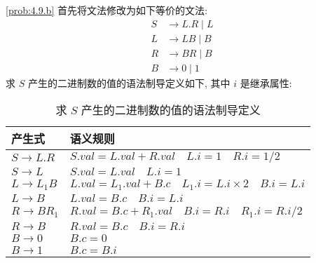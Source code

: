 \documentclass[boxes]{homework}
\begin{document}
\begin{solution}
    \ref{prob:4.9.b} 首先将文法修改为如下等价的文法:
    \begin{equation}
        \begin{aligned}
            S & \to L.R \mid L \\
            L & \to LB \mid B  \\
            R & \to BR \mid B  \\
            B & \to 0 \mid 1
        \end{aligned}
    \end{equation}
    求 $S$ 产生的二进制数的值的语法制导定义如下, 其中 $i$ 是继承属性:
    \begin{table}[htbp]
        \centering
        \caption{求 $S$ 产生的二进制数的值的语法制导定义}
        \begin{tabular}{ll}
            \toprule
            产生式         & 语义规则                                                               \\ \midrule
            $S \to L.R$    & $S.val = L.val + R.val \quad L.i = 1 \quad R.i = 1 / 2$                \\
            $S \to L$      & $S.val = L.val \quad L.i = 1$                                          \\
            $L \to L_{1}B$ & $L.val = L_{1}.val + B.c \quad L_{1}.i = L.i \times 2 \quad B.i = L.i$ \\
            $L \to B$      & $L.val = B.c \quad B.i = L.i$                                          \\
            $R \to BR_{1}$ & $R.val = B.c + R_{1}.val \quad B.i = R.i \quad R_{1}.i = R.i / 2$      \\
            $R \to B$      & $R.val = B.c \quad B.i = R.i$                                          \\
            $B \to 0$      & $B.c = 0$                                                              \\
            $B \to 1$      & $B.c = B.i$                                                            \\ \bottomrule
        \end{tabular}
    \end{table}
\end{solution}
\end{document}
